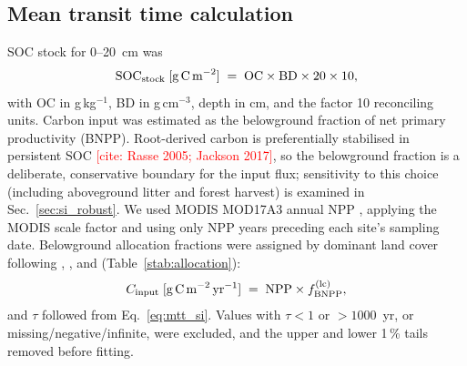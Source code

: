 \documentclass[12pt, a4paper]{article}
\newcommand{\PH}[1]{\textcolor{red}{#1}}
\begin{document}
\subsection{Mean transit time calculation}
SOC stock for 0--20~cm was
\begin{equation}
  \text{SOC}_\text{stock}\;[\text{g\,C\,m}^{-2}] \;=\; \text{OC}\times\text{BD}\times20\times10,
  \label{eq:soc_stock_si}
\end{equation}
with OC in g\,kg$^{-1}$, BD in g\,cm$^{-3}$, depth in cm, and the factor 10 reconciling
units. Carbon input was estimated as the belowground fraction of net primary
productivity (BNPP). Root-derived carbon is preferentially stabilised in persistent SOC
\PH{[cite: Rasse 2005; Jackson 2017]}, so the belowground fraction is a deliberate,
conservative boundary for the input flux; sensitivity to this choice (including
aboveground litter and forest harvest) is examined in
Sec.~\ref{sec:si_robust}. We used MODIS MOD17A3 annual NPP
\citep[2001--2020;][]{Running2021}, applying the MODIS scale factor and using only
NPP years preceding each site's sampling date. Belowground allocation fractions were
assigned by dominant land cover following \citet{Mokany2006}, \citet{Malhi2011}, and
\citet{Litton2008} (Table~\ref{stab:allocation}):
\begin{equation}
  C_\text{input}\;[\text{g\,C\,m}^{-2}\text{\,yr}^{-1}] \;=\; \text{NPP}\times f_\text{BNPP}^{(\text{lc})},
  \label{eq:c_input_si}
\end{equation}
and $\tau$ followed from Eq.~\ref{eq:mtt_si}. Values with $\tau<1$ or $>1000$~yr, or
missing/negative/infinite, were excluded, and the upper and lower 1\,\% tails removed
before fitting.
\end{document}
